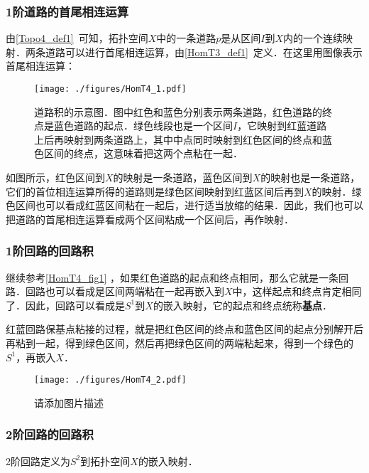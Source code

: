 \subsubsection{1阶道路的首尾相连运算}

由\autoref{Topo4_def1}~可知，拓扑空间$X$中的一条道路$p$是从区间$I$到$X$内的一个连续映射．两条道路可以进行首尾相连运算，由\autoref{HomT3_def1}~定义．在这里用图像表示首尾相连运算：


\begin{figure}[ht]
\centering
\texttt{[image: ./figures/HomT4\_1.pdf]}
\caption{道路积的示意图．图中红色和蓝色分别表示两条道路，红色道路的终点是蓝色道路的起点．绿色线段也是一个区间$I$，它映射到红蓝道路上后再映射到两条道路上，其中中点同时映射到红色区间的终点和蓝色区间的终点，这意味着把这两个点粘在一起．} \label{HomT4_fig1}
\end{figure}

如图所示，红色区间到$X$的映射是一条道路，蓝色区间到$X$的映射也是一条道路，它们的首位相连运算所得的道路则是绿色区间映射到红蓝区间后再到$X$的映射．绿色区间也可以看成红蓝区间粘在一起后，进行适当放缩的结果．因此，我们也可以把道路的首尾相连运算看成两个区间粘成一个区间后，再作映射．

\subsubsection{1阶回路的回路积}

继续参考\autoref{HomT4_fig1} ，如果红色道路的起点和终点相同，那么它就是一条回路．回路也可以看成是区间两端粘在一起再嵌入到$X$中，这样起点和终点肯定相同了．因此，回路可以看成是$S^1$到$X$的嵌入映射，它的起点和终点统称\textbf{基点}．

红蓝回路保基点粘接的过程，就是把红色区间的终点和蓝色区间的起点分别解开后再粘到一起，得到绿色区间，然后再把绿色区间的两端粘起来，得到一个绿色的$S^1$，再嵌入$X$．

\begin{figure}[ht]
\centering
\texttt{[image: ./figures/HomT4\_2.pdf]}
\caption{请添加图片描述} \label{HomT4_fig2}
\end{figure}

\subsubsection{2阶回路的回路积}

2阶回路定义为$S^2$到拓扑空间$X$的嵌入映射．


